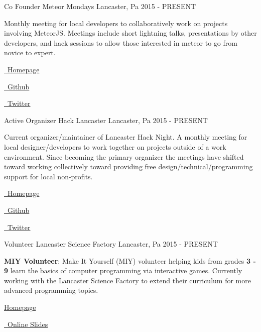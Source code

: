 \begin{cventries}
  \cventry
    {Co Founder}
    {Meteor Mondays}
    {Lancaster, Pa}
    {2015 - PRESENT}
    {
      \begin{cvitems}
        \item {Monthly meeting for local developers to collaboratively work on projects involving MeteorJS.  Meetings include short lightning talks, presentations by other developers, and hack sessions to allow those interested in meteor to go from novice to expert.}
        \item {\href{http://www.meteor-mondays.com}{\faHome\ Homepage}}
        \item {\href{http://github.com/Meteor-Mondays}{\faGithubSquare\ Github}}
        \item {\href{https://twitter.com/meteormondays}{\faTwitter\ Twitter}}
      \end{cvitems}
    }
  \cventry
    {Active Organizer}
    {Hack Lancaster}
    {Lancaster, Pa}
    {2015 - PRESENT}
    {
      \begin{cvitems}
        \item {Current organizer/maintainer of Lancaster Hack Night.  A monthly meeting for local designer/developers to work together on projects outside of a work environment.  Since becoming the primary organizer the meetings have shifted toward working collectively toward providing free design/technical/programming support for local non-profits.}
        \item {\href{http://www.hacklancaster.net/}{\faHome\ Homepage}}
        \item {\href{http://github.com/Hack-Lancaster}{\faGithubSquare\ Github}}
        \item {\href{https://twitter.com/hacklancaster}{\faTwitter\ Twitter}}
      \end{cvitems}
    }

  \cventry
    {Volunteer}
    {Lancaster Science Factory}
    {Lancaster, Pa}
    {2015 - PRESENT}
    {
      \begin{cvitems}
        \item {\textbf{MIY Volunteer}: Make It Yourself (MIY) volunteer helping kids from grades \textbf{3 - 9} learn the basics of computer programming via interactive games.  Currently working with the Lancaster Science Factory to extend their curriculum for more advanced programming topics.}
        \item {\href{http://www.lancastersciencefactory.org/}{\faHome Homepage}}
        \item {\href{http://rjfisher.github.io/Science-Factory-Be-A-Programmer/}{\faGithubSquare\ Online Slides}}
      \end{cvitems}
    }
\end{cventries}

\pagebreak
